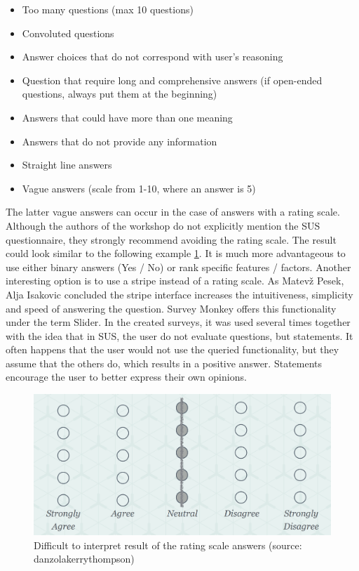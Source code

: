 \documentclass[a4paper,10pt,twoside]{article}
\begin{document}
\begin{itemize}
\item Too many questions (max 10 questions)
\item Convoluted questions
\item Answer choices that do not correspond with user's reasoning
\item Question that require long and comprehensive answers (if open-ended questions, always put them at the beginning)
\item Answers that could have more than one meaning
\item Answers that do not provide any information
\item Straight line answers
\item Vague answers (scale from 1-10, where an answer is 5)
\end{itemize}

The latter vague answers can occur in the case of answers with a rating scale. Although the authors of the workshop do not explicitly mention the SUS questionnaire, they strongly recommend avoiding the rating scale. The result could look similar to the following example \ref{fig:blur_scale}. It is much more advantageous to use either binary answers (Yes / No) or rank specific features / factors. Another interesting option is to use a stripe instead of a rating scale. As Matevž Pesek, Alja Isakovic concluded the stripe interface increases the intuitiveness, simplicity and speed of answering the question. Survey Monkey offers this functionality under the term Slider. In the created surveys, it was used several times together with the idea that in SUS, the user do not evaluate questions, but statements. It often happens that the user would not use the queried functionality, but they assume that the others do, which results in a positive answer. Statements encourage the user to better express their own opinions.

\vspace{0.3cm}
\begin{figure}[hbt!] 
\begin{center}
\includegraphics[width=12cm]{../pictures/blur_scale.png} 
\caption[Difficult to interpret result of the rating scale answers]{Difficult to interpret result of the rating scale answers (source: danzolakerrythompson)}
\label{fig:blur_scale}
\end{center}
\end{figure}
\end{document}
